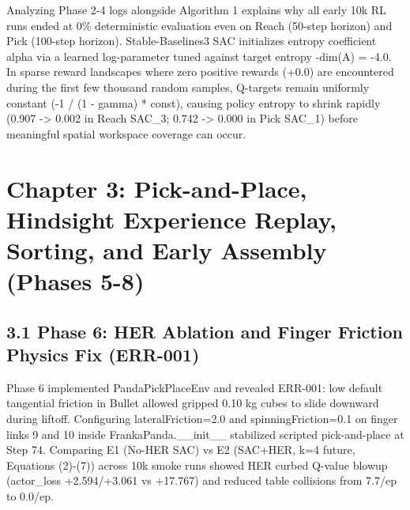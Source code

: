 \documentclass[11pt,a4paper,oneside]{book}
\begin{document}
Analyzing Phase 2-4 logs alongside Algorithm 1 explains why all early 10k RL runs ended at 0\% deterministic evaluation even on Reach (50-step horizon) and Pick (100-step horizon). Stable-Baselines3 SAC initializes entropy coefficient alpha via a learned log-parameter tuned against target entropy -dim(A) = -4.0. In sparse reward landscapes where zero positive rewards (+0.0) are encountered during the first few thousand random samples, Q-targets remain uniformly constant (-1 / (1 - gamma) * const), causing policy entropy to shrink rapidly (0.907 -> 0.002 in Reach SAC\_3; 0.742 -> 0.000 in Pick SAC\_1) before meaningful spatial workspace coverage can occur.

\chapter{Chapter 3: Pick-and-Place, Hindsight Experience Replay, Sorting, and Early Assembly (Phases 5-8)}
\section{3.1 Phase 6: HER Ablation and Finger Friction Physics Fix (ERR-001)}
Phase 6 implemented PandaPickPlaceEnv and revealed ERR-001: low default tangential friction in Bullet allowed gripped 0.10 kg cubes to slide downward during liftoff. Configuring lateralFriction=2.0 and spinningFriction=0.1 on finger links 9 and 10 inside FrankaPanda.\_\_init\_\_ stabilized scripted pick-and-place at Step 74. Comparing E1 (No-HER SAC) vs E2 (SAC+HER, k=4 future, Equations (2)-(7)) across 10k smoke runs showed HER curbed Q-value blowup (actor\_loss +2.594/+3.061 vs +17.767) and reduced table collisions from 7.7/ep to 0.0/ep.
\end{document}
